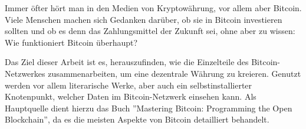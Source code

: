 Immer öfter hört man in den Medien von Kryptowährung, vor allem aber Bitcoin. Viele Menschen machen
sich Gedanken darüber, ob sie in Bitcoin investieren sollten und ob es denn das Zahlungsmittel der 
Zukunft sei, ohne aber zu wissen: Wie funktioniert Bitcoin überhaupt?

Das Ziel dieser Arbeit ist es, herauszufinden, wie die Einzelteile des Bitcoin-Netzwerkes zusammenarbeiten,
um eine dezentrale Währung zu kreieren. Genutzt werden vor allem literarische Werke, aber auch ein
selbstinstallierter Knotenpunkt, welcher Daten im Bitcoin-Netzwerk einsehen kann. Als Hauptquelle dient hierzu
das Buch ''Mastering Bitcoin: Programming the Open Blockchain'', da es die meisten Aspekte von Bitcoin
detailliert behandelt.
